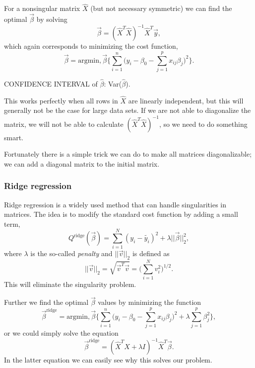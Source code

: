 For a nonsingular matrix $\hat{X}$ (but not necessary symmetric) we can find the optimal $\vec{\beta}$ by solving
\begin{equation}
\vec{\beta}=(\hat{X}^T\hat{X})^{-1}\hat{X}^T\vec{y},
\end{equation}
which again corresponds to minimizing the cost function,
\begin{equation}
\vec{\beta}=\text{argmin},\vec{\beta}\bigg\{\sum_{i=1}^{n}\Big(y_i-\beta_0-\sum_{j=1}^px_{ij}\beta_j\Big)^2\bigg\}.
\end{equation}

CONFIDENCE INTERVAL of $\hat{\beta}$: Var($\hat{\beta}$).

This works perfectly when all rows in $\hat{X}$ are linearly independent, but this will generally not be the case for large data sets. If we are not able to diagonalize the matrix, we will not be able to calculate $(\hat{X}^T\hat{X})^{-1}$, so we need to do something smart. 

Fortunately there is a simple trick we can do to make all matrices diagonalizable; we can add a diagonal matrix to the initial matrix. 


\subsubsection{Ridge regression} \label{sec:ridge}
Ridge regression is a widely used method that can handle singularities in matrices. The idea is to modify the standard cost function by adding a small term,
\begin{equation}
Q^{\text{ridge}}(\vec{\beta})=\sum_{i=1}^N(y_i-\tilde{y_i})^2+\lambda||\vec{\beta}||_2^2,
\end{equation}
where $\lambda$ is the so-called \textit{penalty} and $||\vec{v}||_2$ is defined as
\begin{equation}
||\vec{v}||_2=\sqrt{\vec{v}^T\vec{v}}=\Big(\sum_{i=1}^Nv_i^2\Big)^{1/2}.
\end{equation}
This will eliminate the singularity problem.

Further we find the optimal $\vec{\beta}$ values by minimizing the function 
\begin{equation}
\vec{\beta}^{\text{ridge}}=\text{argmin},\vec{\beta}\bigg\{\sum_{i=1}^{n}\Big(y_i-\beta_0-\sum_{j=1}^px_{ij}\beta_j\Big)^2+\lambda\sum_{j=1}^p\beta_j^2\bigg\}, 
\end{equation}
or we could simply solve the equation
\begin{equation}
\vec{\beta}^{\text{ridge}}=(\hat{X}^T\hat{X}+\lambda I)^{-1}\hat{X}^T\vec{\beta}.
\end{equation}
In the latter equation we can easily see why this solves our problem.


